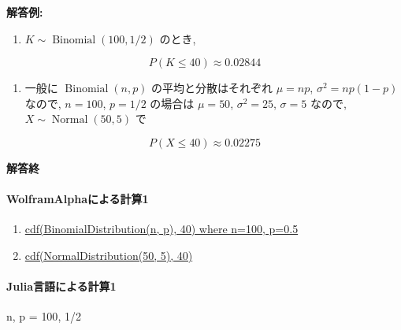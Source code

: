 \documentclass[
  letterpaper,
  DIV=11,
  numbers=noendperiod]{scrartcl}
\let\oldparagraph\paragraph
\renewcommand{\paragraph}[1]{\oldparagraph{#1}\mbox{}}
\newenvironment{Shaded}{\begin{snugshade}}{\end{snugshade}}
\newcommand{\FloatTok}[1]{\textcolor[rgb]{0.68,0.00,0.00}{#1}}
\newcommand{\NormalTok}[1]{\textcolor[rgb]{0.00,0.23,0.31}{#1}}
\newcommand{\OperatorTok}[1]{\textcolor[rgb]{0.37,0.37,0.37}{#1}}
\providecommand{\tightlist}{%
  \setlength{\itemsep}{0pt}\setlength{\parskip}{0pt}}\usepackage{longtable,booktabs,array}
\begin{document}
\textbf{解答例:}

\begin{enumerate}
\def\labelenumi{(\arabic{enumi})}
\tightlist
\item
  \(K\sim \operatorname{Binomial}(100, 1/2)\) のとき,
\end{enumerate}

\[
P(K \le 40) \approx 0.02844
\]

\begin{enumerate}
\def\labelenumi{(\arabic{enumi})}
\setcounter{enumi}{1}
\tightlist
\item
  一般に \(\operatorname{Binomial}(n, p)\) の平均と分散はそれぞれ
  \(\mu=np\), \(\sigma^2=np(1-p)\) なので, \(n=100\), \(p=1/2\) の場合は
  \(\mu=50\), \(\sigma^2=25\), \(\sigma=5\) なので,
  \(X\sim \operatorname{Normal}(50, 5)\) で
\end{enumerate}

\[
P(X \le 40) \approx 0.02275
\]

\textbf{解答終}

\hypertarget{wolframalphaux306bux3088ux308bux8a08ux7b971}{%
\paragraph{WolframAlphaによる計算1}\label{wolframalphaux306bux3088ux308bux8a08ux7b971}}

\begin{enumerate}
\def\labelenumi{(\arabic{enumi})}
\item
  \href{https://www.wolframalpha.com/input?i=cdf\%28BinomialDistribution\%28n\%2C+p\%29\%2C+40\%29+where+n\%3D100\%2C+p\%3D0.5}{cdf(BinomialDistribution(n,
  p), 40) where n=100, p=0.5}
\item
  \href{https://www.wolframalpha.com/input?i=cdf\%28NormalDistribution\%2850\%2C+5\%29\%2C+40\%29}{cdf(NormalDistribution(50,
  5), 40)}
\end{enumerate}

\hypertarget{juliaux8a00ux8a9eux306bux3088ux308bux8a08ux7b971}{%
\paragraph{Julia言語による計算1}\label{juliaux8a00ux8a9eux306bux3088ux308bux8a08ux7b971}}

\begin{Shaded}
\begin{Highlighting}[]
\NormalTok{n, p }\OperatorTok{=} \FloatTok{100}\NormalTok{, }\FloatTok{1}\OperatorTok{/}\FloatTok{2}
\end{Highlighting}
\end{Shaded}
\end{document}

